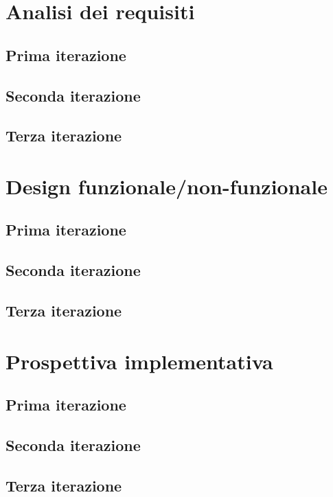 \documentclass[11pt]{article}
\begin{document}
\section{Analisi dei requisiti}
\subsection{Prima iterazione}

\subsection{Seconda iterazione}

\subsection{Terza iterazione}

\section{Design funzionale/non-funzionale}
\subsection{Prima iterazione}

\subsection{Seconda iterazione}

\subsection{Terza iterazione}

\section{Prospettiva implementativa}
\subsection{Prima iterazione}

\subsection{Seconda iterazione}

\subsection{Terza iterazione}
\end{document}

